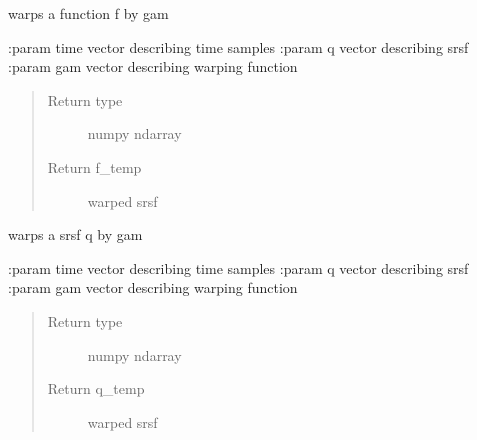 \documentclass[letterpaper,10pt,english]{sphinxmanual}
\begin{document}

\begin{fulllineitems}
\label{\detokenize{utility_functions:utility_functions.warp_f_gamma}}
warps a function f by gam

:param time vector describing time samples
:param q vector describing srsf
:param gam vector describing warping function
\begin{quote}\begin{description}
\item[{Return type}] \leavevmode
numpy ndarray

\item[{Return f\_temp}] \leavevmode
warped srsf

\end{description}\end{quote}

\end{fulllineitems}


\begin{fulllineitems}
\label{\detokenize{utility_functions:utility_functions.warp_q_gamma}}
warps a srsf q by gam

:param time vector describing time samples
:param q vector describing srsf
:param gam vector describing warping function
\begin{quote}\begin{description}
\item[{Return type}] \leavevmode
numpy ndarray

\item[{Return q\_temp}] \leavevmode
warped srsf

\end{description}\end{quote}

\end{fulllineitems}

\end{document}
